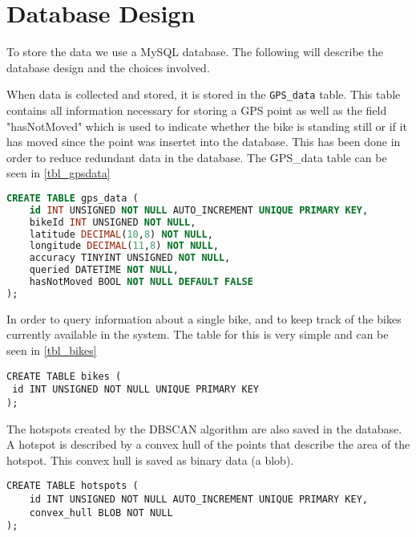 \section{Database Design}
To store the data we use a MySQL database.
The following will describe the database design and the choices involved.

When data is collected and stored, it is stored in the \texttt{GPS\_data} table.
This table contains all information necessary for storing a GPS point as well as the field "hasNotMoved" which is used to indicate whether the bike is standing still or if it has moved since the point was insertet into the database.
This has been done in order to reduce redundant data in the database.
The GPS\_data table can be seen in \cref{tbl_gpsdata}

\begin{lstlisting}[caption=Table for GPS\_data, label=tbl_gpsdata, language=SQL]
CREATE TABLE gps_data (
	id INT UNSIGNED NOT NULL AUTO_INCREMENT UNIQUE PRIMARY KEY,
	bikeId INT UNSIGNED NOT NULL,
	latitude DECIMAL(10,8) NOT NULL,
	longitude DECIMAL(11,8) NOT NULL,
	accuracy TINYINT UNSIGNED NOT NULL,
	queried DATETIME NOT NULL,
	hasNotMoved BOOL NOT NULL DEFAULT FALSE
);
\end{lstlisting}

In order to query information about a single bike, and to keep track of the bikes currently available in the system.
The table for this is very simple and can be seen in \cref{tbl_bikes}

\begin{lstlisting}[caption=Table for bikes, label=tbl_bikes]
CREATE TABLE bikes (
 id INT UNSIGNED NOT NULL UNIQUE PRIMARY KEY
);

\end{lstlisting}

The hotspots created by the DBSCAN algorithm are also saved in the database.
A hotspot is described by a convex hull of the points that describe the area of the hotspot.
This convex hull is saved as binary data (a blob).

\begin{lstlisting}[caption=Table for hotspots, label=tbl]
CREATE TABLE hotspots (
	id INT UNSIGNED NOT NULL AUTO_INCREMENT UNIQUE PRIMARY KEY,
	convex_hull BLOB NOT NULL
);
\end{lstlisting}